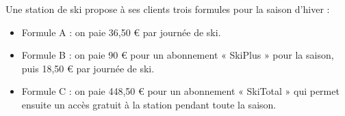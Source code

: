 
\medskip

Une station de ski propose à ses clients trois formules pour la saison d'hiver :

\begin{itemize}
	\item Formule A : on paie 36,50 \euro{} par journée de ski.
	
	\item Formule B : on paie 90 \euro{} pour un abonnement « SkiPlus » pour la saison, puis 18,50 \euro{} par journée de ski.
	
	\item Formule C : on paie 448,50 \euro{} pour un abonnement « SkiTotal » qui permet ensuite un accès gratuit à la station pendant toute la saison.
\end{itemize}

\medskip

